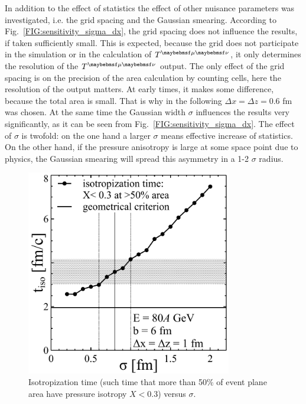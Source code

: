 In addition to the effect of statistics the effect of other nuisance parameters
was investigated, i.e. the grid spacing and the Gaussian smearing. According to
Fig.~\ref{FIG:sensitivity_sigma_dx}, the grid spacing does not influence the
results, if taken sufficiently small. This is expected, because the grid does
not participate in the simulation or in the calculation of $\Tmn$, it only
determines the resolution of the $\Tmn$ output. The only effect of the grid spacing
is on the precision of the area calculation by counting cells, here the resolution
of the output matters. At early times, it makes some difference, because the
total area is small. That is why in the following $\Delta x = \Delta z = 0.6$
fm was chosen. At the same time the Gaussian width $\sigma$ influences the results very
significantly, as it can be seen from Fig.~\ref{FIG:sensitivity_sigma_dx}. The
effect of $\sigma$ is twofold: on the one hand a larger $\sigma$ means
effective increase of statistics. On the other hand, if the pressure anisotropy
is large at some space point due to physics, the Gaussian smearing will spread
this asymmetry in a 1-2 $\sigma$ radius.

\begin{figure}
  \includegraphics[height = 9cm]{plots/thermalization_urqmd/t_iso_vs_sigma.pdf}
  \caption{Isotropization time (such time that more than 50\% of event plane
           area have pressure isotropy $X < 0.3$) versus $\sigma$.}
  \label{FIG:t_iso_sensitivity_sigma}
\end{figure}


